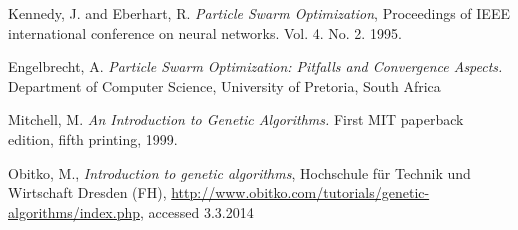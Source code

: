 \documentclass[twoside]{article}
\begin{document}
\begin{multicols}{2}
\begin{thebibliography}{99}
 Kennedy, J. and Eberhart, R.
  \emph{Particle Swarm Optimization},
 Proceedings of IEEE international conference on neural networks. Vol. 4. No. 2. 1995. 
 
 Engelbrecht, A. \emph{Particle Swarm Optimization: Pitfalls and Convergence Aspects.}
 Department of Computer Science, University of Pretoria, South Africa
 
Mitchell, M. \emph{An Introduction to Genetic Algorithms.} First MIT paperback edition, fifth printing, 1999. 
 
Obitko, M., \emph{Introduction to genetic algorithms}, Hochschule f\"ur Technik und Wirtschaft Dresden (FH), \url{http://www.obitko.com/tutorials/genetic-algorithms/index.php}, accessed 3.3.2014

 
\end{thebibliography}


\end{multicols}
\end{document}
